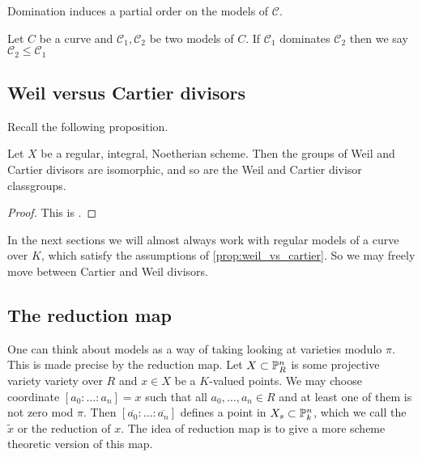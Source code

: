 Domination induces a partial order on the models of $\mathscr C$. 
\begin{definition}
	Let $C$ be a curve and $\mathscr C_1, \mathscr C_2$ be two models of $C$. 
	If $\mathscr C_1$ dominates $\mathscr C_2$ then we say $\mathscr C_2 \le \mathscr C_1$
\end{definition}





\subsection{Weil versus Cartier divisors} \label{sec:weil_versus_cartier_divisors}

Recall the following proposition. 
\begin{proposition}\label{prop:weil_vs_cartier}
	Let $X$ be a regular, integral, Noetherian scheme. Then the groups of Weil and Cartier divisors are isomorphic, and so are the Weil and Cartier divisor classgroups. 
\end{proposition}
\begin{proof}
	This is \cite[prop.\ 7.2.16]{liuAlgebraicGeometryArithmetic2002}. 
\end{proof}

In the next sections we will almost always work with regular models of a curve over $K$, which satisfy the assumptions of \cref{prop:weil_vs_cartier}. So we may freely move between Cartier and Weil divisors. 

\subsection{The reduction map} \label{sec:the_reduction_map_models}
One can think about models as a way of taking looking at varieties modulo $\pi$. 
This is made precise by the reduction map. 
Let $ X\subset \mathbb{P}^{n}_R$ is some projective variety variety over $R$ and $x \in X$ be a $K$-valued points. 
We may choose coordinate $[a_0:\ldots:a_n] = x$ such that all $a_0, \ldots, a_n \in R$ and at least one of them is not zero mod $\pi$.  
Then $[\overline{a_0}: \ldots :\overline{a_n}]$ defines a point in $X_s \subset  \mathbb{P}^{n}_k$, which we call the $\tilde x$ or the reduction of $x$.  
The idea of reduction map is to give a more scheme theoretic version of this map. 

